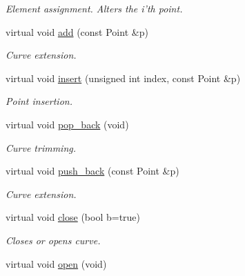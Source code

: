 \begin{DoxyCompactItemize}
\begin{DoxyCompactList}\small\item\em Element assignment. Alters the i'th point. \end{DoxyCompactList}\item 
virtual void \hyperlink{classPolygonalCurve_ae6bd095451111f38e7d8c132180e3fd8}{add} (const Point \&p)
\begin{DoxyCompactList}\small\item\em Curve extension. \end{DoxyCompactList}\item 
virtual void \hyperlink{classPolygonalCurve_a68913a678bd76ad9902c54977d437621}{insert} (unsigned int index, const Point \&p)
\begin{DoxyCompactList}\small\item\em Point insertion. \end{DoxyCompactList}\item 
virtual void \hyperlink{classPolygonalCurve_a65d882fd96f619d8630bcd92e82bde71}{pop\_\-back} (void)
\begin{DoxyCompactList}\small\item\em Curve trimming. \end{DoxyCompactList}\item 
virtual void \hyperlink{classPolygonalCurve_a3aa62996c6c8c384f11765f169fe9348}{push\_\-back} (const Point \&p)
\begin{DoxyCompactList}\small\item\em Curve extension. \end{DoxyCompactList}\item 
virtual void \hyperlink{classPolygonalCurve_a07c8d065a54875d3d04c3d6c2b622045}{close} (bool b=true)
\begin{DoxyCompactList}\small\item\em Closes or opens curve. \end{DoxyCompactList}\item 
\hypertarget{classPolygonalCurve_a48ec14e33a86a4f570469cbf9fc61cae}{
virtual void \hyperlink{classPolygonalCurve_a48ec14e33a86a4f570469cbf9fc61cae}{open} (void)}
\label{classPolygonalCurve_a48ec14e33a86a4f570469cbf9fc61cae}


\end{DoxyCompactItemize}
